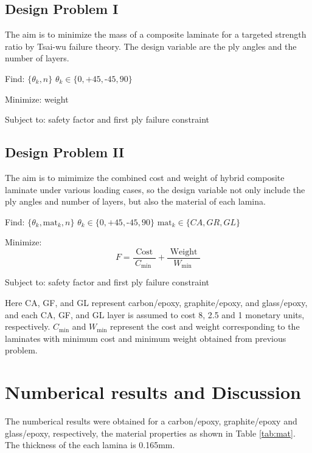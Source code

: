 \documentclass[smallextended]{svjour3}       %
\begin{document}
\subsection{Design Problem I}


The aim is to minimize the mass of a composite laminate for a targeted strength
ratio by Tsai-wu failure theory. The design variable are the ply angles and the
number of layers.

Find: $\{\theta_k, n\}$ $\theta_k \in \{ 0,\text{+}45,\text{-}45,90\}$ 

Minimize: weight

Subject to: safety factor and first ply failure constraint


\subsection{Design Problem II}
The aim is to mimimize the combined cost and weight of hybrid composite
laminate under various loading cases, so the design variable not only include
the ply angles and number of layers, but also the material of each lamina. 


Find: $\{\theta_k,\text{mat}_k, n\}$ $\theta_k \in \{ 0,\text{+}45,\text{-}45,90\}$ $\text{mat}_k \in \{CA, GR, GL \}$

Minimize: 
\begin{equation}
	F=\frac{\text { Cost }}{C_{\text {min }}}+\frac{\text { Weight }}{W_{\text {min }}}
\end{equation}

Subject to: safety factor and first ply failure constraint


Here CA, GF, and GL represent carbon/epoxy, graphite/epoxy, and glass/epoxy,
and each CA, GF, and GL layer is assumed to cost 8, 2.5 and 1 monetary units,
respectively. $C_{\text{min}}$ and $W_{\text{min}}$ represent the cost and
weight corresponding to the laminates with minimum cost and minimum weight
obtained from previous problem.








\section{Numberical results and Discussion}
The numberical results were obtained for a carbon/epoxy, graphite/epoxy and
glass/epoxy, respectively, the material properties as shown in Table
\ref{tab:mat}. The thickness of the each lamina is 0.165mm.
\end{document}
